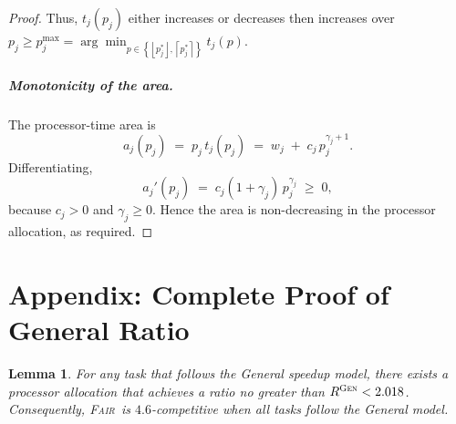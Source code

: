 \documentclass{article}
\newtheorem{lemma}{Lemma}
\newcommand\fair{\textsc{Fair}\xspace}
\newcommand\GEN{\textsc{Gen}\xspace}
\begin{document}
\begin{proof}
      Thus, \( t_j(p_j) \) either increases or decreases then increases over \( p_j \geq 
p_j^{\max} = \arg\min_{p \in \left\{\left\lfloor p_j^* \right\rfloor, \left\lceil p_j^* \right\rceil\right\}} t_j(p)
\).

\subparagraph*{Monotonicity of the area.}
The processor-time area is
\[
a_j(p_j)\;=\;p_j\,t_j(p_j)
            \;=\;w_j\;+\;c_j\,p_j^{\gamma_j+1}.
\]
Differentiating,
\[
a_j'(p_j)
    \;=\;c_j(1+\gamma_j)\,p_j^{\gamma_j}\;\ge\;0,
\]
because \(c_j>0\) and \(\gamma_j\ge 0\).
Hence the area is non-decreasing in the processor allocation, as required.

\end{proof}



\section{Appendix: Complete Proof of General Ratio}
\label{ap.general}


\begin{lemma}
For any task that follows the General speedup model, there exists a processor allocation that achieves a ratio no greater than $R^{\GEN}<2.018$. Consequently, \fair\ is $4.6$-competitive when all tasks follow the General model.
\end{lemma}
\end{document}
